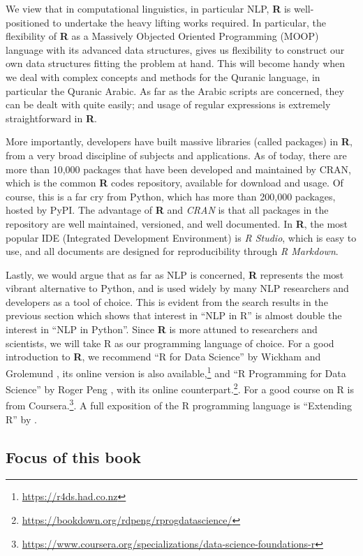 \documentclass[
]{article}
\begin{document}
We view that in computational linguistics, in particular NLP, \textbf{R} is well-positioned to undertake the heavy lifting works required. In particular, the flexibility of \textbf{R} as a Massively Objected Oriented Programming (MOOP) language with its advanced data structures, gives us flexibility to construct our own data structures fitting the problem at hand. This will become handy when we deal with complex concepts and methods for the Quranic language, in particular the Quranic Arabic. As far as the Arabic scripts are concerned, they can be dealt with quite easily; and usage of regular expressions is extremely straightforward in \textbf{R}.

More importantly, developers have built massive libraries (called packages) in \textbf{R}, from a very broad discipline of subjects and applications. As of today, there are more than 10,000 packages that have been developed and maintained by CRAN, which is the common \textbf{R} codes repository, available for download and usage. Of course, this is a far cry from Python, which has more than 200,000 packages, hosted by PyPI. The advantage of \textbf{R} and \emph{CRAN} is that all packages in the repository are well maintained, versioned, and well documented. In \textbf{R}, the most popular IDE (Integrated Development Environment) is \emph{R Studio}, which is easy to use, and all documents are designed for reproducibility through \emph{R Markdown}.

Lastly, we would argue that as far as NLP is concerned, \textbf{R} represents the most vibrant alternative to Python, and is used widely by many NLP researchers and developers as a tool of choice. This is evident from the search results in the previous section which shows that interest in ``NLP in R'' is almost double the interest in ``NLP in Python''. Since \textbf{R} is more attuned to researchers and scientists, we will take R as our programming language of choice. For a good introduction to \textbf{R}, we recommend ``R for Data Science'' by Wickham and Grolemund \citep{wickham2016}, its online version is also available,\footnote{\url{https://r4ds.had.co.nz}} and ``R Programming for Data Science'' by Roger Peng \citep{peng2014}, with its online counterpart.\footnote{\url{https://bookdown.org/rdpeng/rprogdatascience/}}. For a good course on R is from Coursera.\footnote{\url{https://www.coursera.org/specializations/data-science-foundations-r}}. A full exposition of the R programming language is ``Extending R'' by \citep{chambers2016}.

\hypertarget{focus-of-this-book}{%
\subsection{Focus of this book}\label{focus-of-this-book}}
\end{document}
